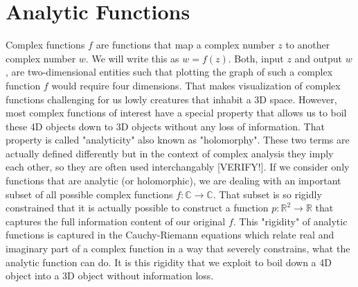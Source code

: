 \documentclass[12pt]{article}
\begin{document}
\section{Analytic Functions}
Complex functions $f$ are functions that map a complex number $z$ to another complex number $w$. We will write this as $w = f(z)$. Both, input $z$ and output $w$, are two-dimensional entities such that plotting the graph of such a complex function $f$ would require four dimensions. That makes visualization of complex functions challenging for us lowly creatures that inhabit a 3D space. However, most complex functions of interest have a special property that allows us to boil these 4D objects down to 3D objects without any loss of information. That property is called "analyticity" also known as "holomorphy". These two terms are actually defined differently but in the context of complex analysis they imply each other, so they are often used interchangably [VERIFY!]. If we consider only functions that are analytic (or holomorphic), we are dealing with an important subset of all possible complex functions $f: \mathbb{C} \rightarrow \mathbb{C}$. That subset is so rigidly constrained that it is actually possible to construct a function $p: \mathbb{R}^2 \rightarrow \mathbb{R}$ that captures the full information content of our original $f$. This "rigidity" of analytic functions is captured in the  Cauchy-Riemann equations which relate real and imaginary part of a complex function in a way that severely constrains, what the analytic function can do. It is this rigidity that we exploit to boil down a 4D object into a 3D object without information loss.
\end{document}
